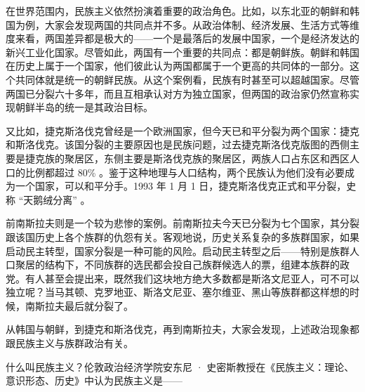 





在世界范围内，民族主义依然扮演着重要的政治角色。比如，以东北亚的朝鲜和韩国为例，大家会发现两国的共同点并不多。从政治体制、经济发展、生活方式等维度来看，两国差异都是极大的——一个是最落后的发展中国家，一个是经济发达的新兴工业化国家。尽管如此，两国有一个重要的共同点：都是朝鲜族。朝鲜和韩国在历史上属于一个国家，他们彼此认为两国都属于一个更高的共同体的一部分。这个共同体就是统一的朝鲜民族。从这个案例看，民族有时甚至可以超越国家。尽管两国已分裂六十多年，而且互相承认对方为独立国家，但两国的政治家仍然宣称实现朝鲜半岛的统一是其政治目标。

又比如，捷克斯洛伐克曾经是一个欧洲国家，但今天已和平分裂为两个国家：捷克和斯洛伐克。该国分裂的主要原因也是民族问题，过去捷克斯洛伐克版图的西侧主要是捷克族的聚居区，东侧主要是斯洛伐克族的聚居区，两族人口占东区和西区人口的比例都超过 80\% 。鉴于这种地理与人口结构，两个民族认为他们没有必要成为一个国家，可以和平分手。1993 年 1 月 1 日，捷克斯洛伐克正式和平分裂，史称 “天鹅绒分离” 。

前南斯拉夫则是一个较为悲惨的案例。前南斯拉夫今天已分裂为七个国家，其分裂跟该国历史上各个族群的仇怨有关。客观地说，历史关系复杂的多族群国家，如果启动民主转型，国家分裂是一种可能的风险。启动民主转型之后——特别是族群人口聚居的结构下，不同族群的选民都会投自己族群候选人的票，组建本族群的政党。有人甚至会提出来，既然我们这块地方绝大多数都是斯洛文尼亚人，可不可以独立呢？当马其顿、克罗地亚、斯洛文尼亚、塞尔维亚、黑山等族群都这样想的时候，南斯拉夫最后就分裂了。

从韩国与朝鲜，到捷克和斯洛伐克，再到南斯拉夫，大家会发现，上述政治现象都跟民族主义与族群政治有关。

什么叫民族主义？伦敦政治经济学院安东尼 · 史密斯教授在《民族主义：理论、意识形态、历史》中认为民族主义是——

